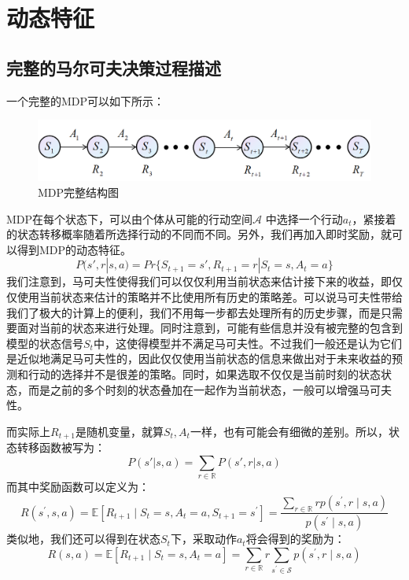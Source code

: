 \documentclass[a4paper]{article}
\begin{document}
\section{动态特征}
\subsection{完整的马尔可夫决策过程描述}
一个完整的MDP可以如下所示：
\begin{figure}[H]
    \centering
    \includegraphics[width=.80\textwidth]{微信图片_20200719161809.png}
    \caption{MDP完整结构图}
    \label{fig:my_label_1}
\end{figure}
MDP在每个状态下，可以由个体从可能的行动空间$\mathcal{A}$ 中选择一个行动$a_t$，紧接着的状态转移概率随着所选择行动的不同而不同。另外，我们再加入即时奖励，就可以得到MDP的动态特征。
\begin{equation}
    P(s',r|s,a) = Pr\{ S_{t+1}=s',R_{t+1}=r|S_t=s,A_t=a \}
\end{equation}
我们注意到，马可夫性使得我们可以仅仅利用当前状态来估计接下来的收益，即仅仅使用当前状态来估计的策略并不比使用所有历史的策略差。可以说马可夫性带给我们了极大的计算上的便利，我们不用每一步都去处理所有的历史步骤，而是只需要面对当前的状态来进行处理。同时注意到，可能有些信息并没有被完整的包含到模型的状态信号$S_t$中，这使得模型并不满足马可夫性。不过我们一般还是认为它们是近似地满足马可夫性的，因此仅仅使用当前状态的信息来做出对于未来收益的预测和行动的选择并不是很差的策略。同时，如果选取不仅仅是当前时刻的状态状态，而是之前的多个时刻的状态叠加在一起作为当前状态，一般可以增强马可夫性。

而实际上$R_{t+1}$是随机变量，就算$S_t,A_t$一样，也有可能会有细微的差别。所以，状态转移函数被写为：
\begin{equation}
    P(s'|s,a) = \sum_{r\in \mathbb{R}} P(s',r|s,a)
\end{equation}
而其中奖励函数可以定义为：
\begin{equation}R\left(s^{\prime}, s, a\right)=\mathbb{E}\left[R_{t+1} \mid S_{t}=s, A_{t}=a, S_{t+1}=s^{\prime}\right]=\frac{\sum_{r \in \mathbb{R}} r p\left(s^{\prime}, r \mid s, a\right)}{p\left(s^{\prime} \mid s, a\right)}\end{equation}
类似地，我们还可以得到在状态$S_t$下，采取动作$a_t$将会得到的奖励为：
\begin{equation}R(s, a)=\mathbb{E}\left[R_{t+1} \mid S_{t}=s, A_{t}=a\right]=\sum_{r \in \mathbb{R}} r \sum_{s^{\prime} \in \mathcal{S}} p\left(s^{\prime}, r \mid s, a\right)\end{equation}
\end{document}
